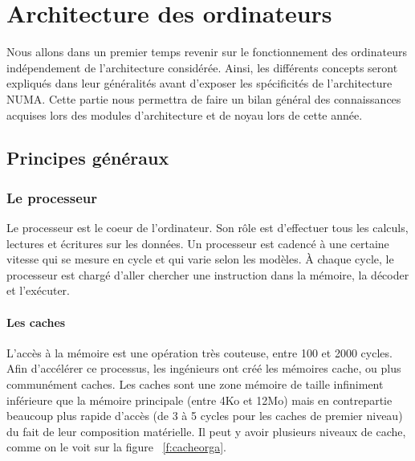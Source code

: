 \pagestyle{fancy}
\chapter{Architecture des ordinateurs}

  \lettrine[nindent=0em,lines=3]{N} ous allons dans un premier temps revenir sur
  le fonctionnement des ordinateurs indépendement de l'architecture
  considérée. Ainsi, les différents concepts seront expliqués dans leur
  généralités avant d'exposer les spécificités de l'architecture NUMA. Cette
  partie nous permettra de faire un bilan général des connaissances acquises
  lors des modules d'architecture et de noyau lors de cette année.


  \section{Principes généraux}

    \subsection{Le processeur}

    Le processeur est le coeur de l'ordinateur.  Son rôle est d'effectuer tous
    les calculs, lectures et écritures sur les données. Un processeur est
    cadencé à une certaine vitesse qui se mesure en cycle et qui varie selon les
    modèles. À chaque cycle, le processeur est chargé d'aller chercher une
    instruction dans la mémoire, la décoder et l'exécuter.

    \subsubsection{Les caches}

      L'accès à la mémoire est une opération très couteuse, entre 100 et 2000
      cycles\cite{Lepers2014}. Afin d'accélérer ce processus, les ingénieurs ont
      créé les mémoires cache, ou plus communément caches. Les caches sont une
      zone mémoire de taille infiniment inférieure que la mémoire principale
      (entre 4Ko et 12Mo) mais en contrepartie beaucoup plus rapide d'accès (de
      3 à 5 cycles pour les caches de premier niveau) du fait de leur
      composition matérielle. Il peut y avoir plusieurs niveaux de cache, comme
      on le voit sur la figure ~\ref{f:cacheorga}.


